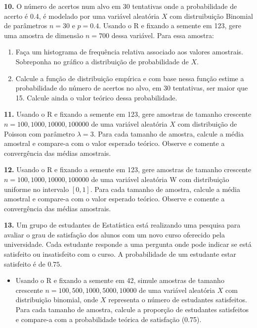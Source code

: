 \documentclass[
]{book}
\providecommand{\tightlist}{%
  \setlength{\itemsep}{0pt}\setlength{\parskip}{0pt}}
\begin{document}
\textbf{10.} O número de acertos num alvo em 30 tentativas onde a
probabilidade de acerto é 0.4, é modelado por uma variável aleatória \(X\)
com distruibuição Binomial de parâmetros \(n=30\) e \(p=0.4\). Usando o R e
fixando a semente em 123, gere uma amostra de dimensão \(n=700\) dessa
variável. Para essa amostra:

\begin{enumerate}
\def\labelenumi{(\alph{enumi})}
\item
  Faça um histograma de frequência relativa associado aos valores
  amostrais. Sobreponha no gráfico a distribuição de probabilidade de \(X\).
\item
  Calcule a função de distribuição empírica e com base nessa
  função estime a probabilidade do número de acertos no alvo, em 30
  tentativas, ser maior que 15. Calcule ainda o valor teórico dessa
  probabilidade.
\end{enumerate}

\textbf{11.} Usando o R e fixando a semente em 123, gere amostras de tamanho
crescente \(n = 100, 1000, 10000, 100000\) de uma variável aleatória \(X\)
com distribuição de Poisson com parâmetro \(\lambda = 3\). Para cada
tamanho de amostra, calcule a média amostral e compare-a com o valor
esperado teórico. Observe e comente a convergência das médias amostrais.

\textbf{12.} Usando o R e fixando a semente em 123, gere amostras de tamanho
crescente \(n = 100, 1000, 10000, 100000\) de uma variável aleatória W com
distribuição uniforme no intervalo \([0, 1]\). Para cada tamanho de
amostra, calcule a média amostral e compare-a com o valor esperado
teórico. Observe e comente a convergência das médias amostrais.

\textbf{13.} Um grupo de estudantes de Estatística está realizando uma
pesquisa para avaliar o grau de satisfação dos alunos com um novo curso
oferecido pela universidade. Cada estudante responde a uma pergunta onde
pode indicar se está satisfeito ou insatisfeito com o curso. A
probabilidade de um estudante estar satisfeito é de \(0.75\).

\begin{itemize}
\tightlist
\item
  Usando o R e fixando a semente em 42, simule amostras de tamanho
  crescente \(n = 100, 500, 1000, 5000, 10000\) de uma variável
  aleatória \(X\) com distribuição binomial, onde \(X\) representa o
  número de estudantes satisfeitos. Para cada tamanho de amostra,
  calcule a proporção de estudantes satisfeitos e compare-a com a
  probabilidade teórica de satisfação (0.75).
\end{itemize}
\end{document}
